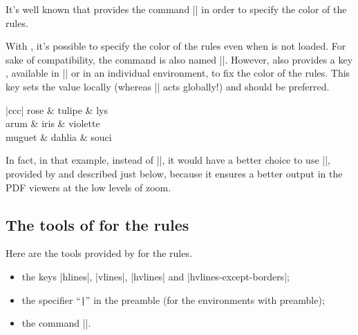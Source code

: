 \documentclass[dvipsnames]{article}
\let\myrlap\rlap
\begin{document}
\smallskip
It's well known that  provides the command |\arrayrulecolor| in
order to specify the color of the rules.

\smallskip
{}
With , it's possible to specify the color of the rules even when
 is not loaded. For sake of compatibility, the command is also
named |\arrayrulecolor|. However,  also provides a key
, available in |\NiceMatrixOptions| or in an individual 
environment, to fix the color of the rules. This key sets the value locally
(whereas |\arrayrulecolor| acts globally!) and should be preferred.

\medskip
\begin{Code}[width=10cm,show-output,no-cell-nodes]
\begin{NiceTabular}{|ccc|}\myrlap{[\emph{rules/color=[gray]{0.9},rules/width=1pt}]}
\hline
  rose & tulipe & lys \\
  arum & iris & violette \\
  muguet & dahlia & souci \\
\hline
\end{NiceTabular}
\end{Code}



\medskip
In fact, in that example, instead of |\hline|, it would have a better choice to
use |\Hline|, provided by  and described just below, because it
ensures a better output in the PDF viewers at the low levels of zoom.

\subsection{The tools of \texorpdfstring{}{nicematrix} for the rules}

Here are the tools provided by  for the rules.
\begin{itemize}
\item the keys |hlines|, |vlines|, |hvlines| and |hvlines-except-borders|;
\item the specifier ``\verb+|+'' in the preamble (for the environments with
preamble);
\item {}
the command |\Hline|.
\end{itemize}
\end{document}
